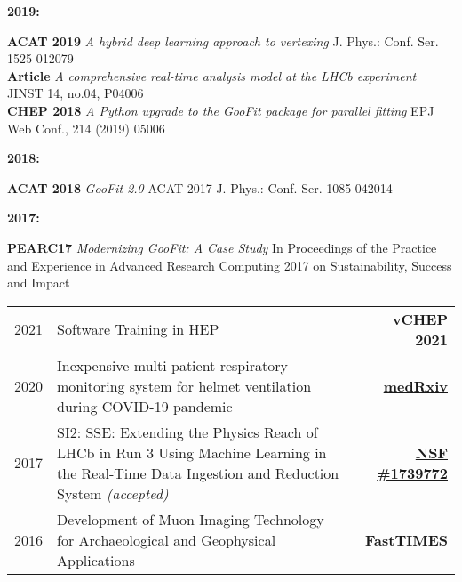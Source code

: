 \documentclass[10pt,letterpaper]{moderncv}
\begin{document}
\begin{minipage}[t]{.065\textwidth}
\textbf{2019:}
\end{minipage}%
\begin{minipage}[t]{.935\textwidth}
\textbf{ACAT 2019} \emph{A hybrid deep learning approach to vertexing} J. Phys.: Conf. Ser. 1525 012079 \\ 
\textbf{Article}   \emph{A comprehensive real-time analysis model at the LHCb experiment} JINST 14, no.04, P04006 \\
\textbf{CHEP 2018} \emph{A Python upgrade to the GooFit package for parallel fitting} EPJ Web Conf., 214 (2019) 05006
\end{minipage}

\begin{minipage}[t]{.065\textwidth}
\textbf{2018:}
\end{minipage}%
\begin{minipage}[t]{.935\textwidth}
\textbf{ACAT 2018} \emph{GooFit 2.0} ACAT 2017 J. Phys.: Conf. Ser. 1085 042014
\end{minipage}

\begin{minipage}[t]{.065\textwidth}
\textbf{2017:}
\end{minipage}%
\begin{minipage}[t]{.935\textwidth}
\textbf{PEARC17} \emph{Modernizing GooFit: A Case Study} In Proceedings of the Practice and Experience in Advanced Research Computing 2017 on Sustainability, Success and Impact
\end{minipage}


\begin{tabularx}{\textwidth}{p{.8in}X>{\bfseries}r}
2021 & Software Training in HEP & vCHEP 2021 \\ 
2020 & Inexpensive multi-patient respiratory monitoring system for helmet ventilation during COVID-19 pandemic & \href{https://doi.org/10.1101/2020.06.29.20141283}{medRxiv} \\
2017 & SI2: SSE: Extending the Physics Reach of LHCb in Run 3 Using Machine Learning in the Real-Time Data Ingestion and Reduction System  \textit{(accepted)} & \href{https://nsf.gov/awardsearch/showAward?AWD_ID=1739772}{NSF \#1739772} \\ %
2016 & Development of Muon Imaging Technology
for Archaeological and Geophysical Applications & FastTIMES \\
%
\end{tabularx}
\end{document}
